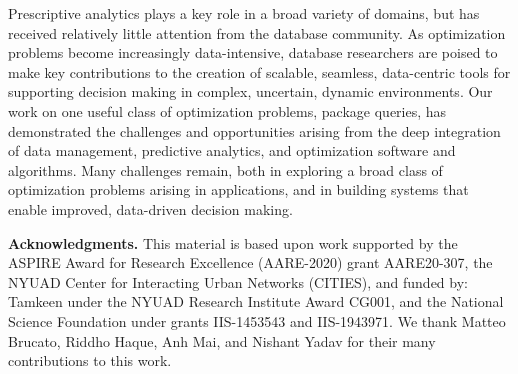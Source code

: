 \documentclass[11pt]{article}
\begin{document}
Prescriptive analytics plays a key role in a broad variety of domains, but has received relatively little attention from the database community. As optimization problems become increasingly data-intensive, database researchers are poised to make key contributions to the creation of scalable, seamless, data-centric tools for supporting decision making in complex, uncertain, dynamic environments. Our work on one useful class of optimization problems, package queries, has demonstrated the challenges and opportunities arising from the deep integration of data management, predictive analytics, and optimization software and algorithms. Many challenges remain, both in exploring a broad class of optimization problems arising in applications, and in building systems that enable improved, data-driven decision making.

   
    \smallskip
\noindent
   \textbf{Acknowledgments.}
  This material is based upon work supported by the ASPIRE Award for Research Excellence (AARE-2020) grant AARE20-307, the NYUAD Center for Interacting Urban Networks (CITIES), and funded by: Tamkeen under the NYUAD Research Institute Award CG001, and the National Science Foundation under grants IIS-1453543 and IIS-1943971. We thank Matteo Brucato, Riddho Haque, Anh Mai, and Nishant Yadav for their many contributions to this work.
  
\end{document}
